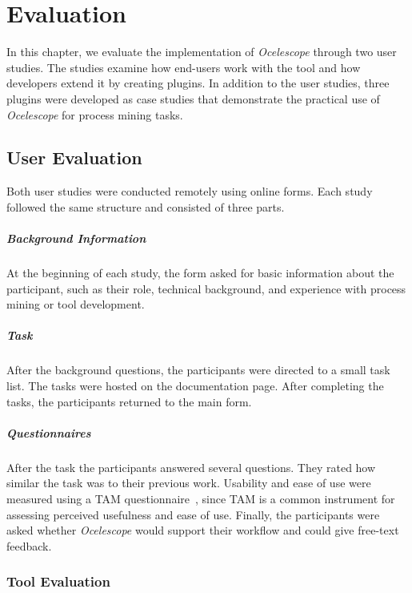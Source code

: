 \chapter{Evaluation}
\label{chap:eval}

In this chapter, we evaluate the implementation of \textit{Ocelescope} through two user studies.
The studies examine how end-users work with the tool and how developers extend it by creating plugins.
In addition to the user studies, three plugins were developed as case studies that demonstrate the practical use of \textit{Ocelescope} for process mining tasks.

\section{User Evaluation}

Both user studies were conducted remotely using online forms. Each study followed the same structure and consisted of three parts.

\paragraph{Background Information}
At the beginning of each study, the form asked for basic information about the participant, such as their role, technical background, and experience with process mining or tool development.

\paragraph{Task}
After the background questions, the participants were directed to a small task list.
The tasks were hosted on the documentation page.
After completing the tasks, the participants returned to the main form.

\paragraph{Questionnaires}
After the task the participants answered several questions.
They rated how similar the task was to their previous work.
Usability and ease of use were measured using a TAM questionnaire~\cite{tam}, since TAM is a common instrument for assessing perceived usefulness and ease of use.
Finally, the participants were asked whether \textit{Ocelescope} would support their workflow and could give free-text feedback.

\subsection{Tool Evaluation}


